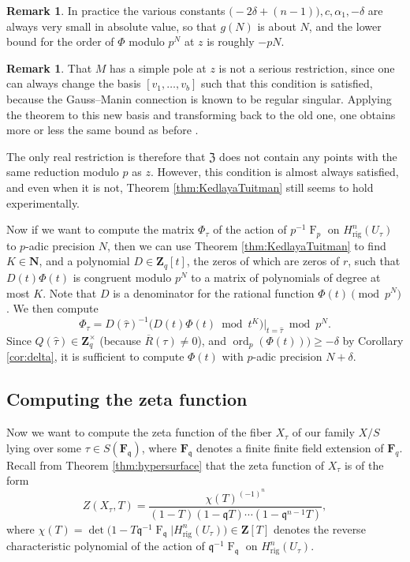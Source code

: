 \documentclass[a4paper,11pt]{article}
\numberwithin{equation}{section}
\newcommand{\NN}{\mathbf{N}} %
\newcommand{\ZZ}{\mathbf{Z}} %
\newcommand{\FF}{\mathbf{F}} %
\DeclareMathOperator{\ord}{ord}          %
\DeclareMathOperator{\Frob}{F}           %
\providecommand{\Hrig}{H_{\text{rig}}}  %
\theoremstyle{definition}
\newtheorem{rem}[thm]{Remark}
\begin{document}
\begin{rem}
In practice the various constants $\bigl( -2 \delta + (n-1) \bigr), c, \alpha_1, -\delta$ are always very small
in absolute value, so that $g(N)$ is about $N$, and the lower bound for the order of $\Phi$ modulo $p^N$ at $z$ is roughly $-pN$.
\end{rem}

\begin{rem}
That $M$ has a simple pole at $z$ is not a serious restriction, since
one can always change the basis $[v_1,\dotsc,v_b]$ such that this condition is
satisfied, because the Gauss--Manin connection is known to be regular singular. 
Applying the theorem to this new basis and transforming back to the old one, one
obtains more or less the same bound as before \citep[Corollary~2.6]{KedlayaTuitman2012}.

The only real restriction is therefore that $\mathfrak{Z}$ does not contain any points
with the same reduction modulo $p$ as $z$. However, this condition is almost always
satisfied, and even when it is not, Theorem \ref{thm:KedlayaTuitman} still seems
to hold experimentally.
\end{rem}

Now if we want to compute the matrix $\Phi_{\tau}$ of the action of $p^{-1} \Frob_p$ on 
$\Hrig^{n}(U_{\tau})$ to $p$-adic precision $N$, then we can use Theorem \ref{thm:KedlayaTuitman} 
to find $K \in \NN$, and a polynomial $D \in \ZZ_q[t]$, the zeros of which are zeros of $r$, such that 
$D(t) \Phi(t)$ is congruent modulo $p^N$ to a matrix of polynomials of degree at most $K$. Note that
$D$ is a denominator for the rational function $\Phi(t) \pmod{p^N}$. We then compute
\begin{equation*}
\Phi_{\tau} = D(\hat{\tau})^{-1} \bigl( D(t) \Phi(t) \bmod{t^{K}} \bigr)|_{t=\hat{\tau}} \bmod{p^{N}}.
\end{equation*}
Since $Q(\hat{\tau}) \in \ZZ_q^{\times}$ (because $\overline{R}(\tau) \neq 0$), and $\ord_p(\Phi(t))) \geq -\delta$
by Corollary \ref{cor:delta}, it is sufficient to compute $\Phi(t)$ with $p$-adic precision $N+\delta$.

\subsection{Computing the zeta function}
\label{sec:ZetaFunctions}

Now we want to compute the zeta function of the fiber $X_{\tau}$ of
our family $X/S$ lying over some $\tau \in S(\FF_{\mathfrak{q}})$, 
where $\FF_{\mathfrak{q}}$ denotes a finite finite field extension of $\FF_q$.  
Recall from Theorem \ref{thm:hypersurface} 
that the zeta function of $X_{\tau}$ is of the form
\begin{equation*}
Z(X_{\tau},T) = \frac{\chi(T)^{(-1)^n}}{(1 - T) (1 - \mathfrak{q}T) \dotsm (1 - \mathfrak{q}^{n-1}T)},
\end{equation*}
where $\chi(T) = \det \bigl( 1 - T \mathfrak{q}^{-1} \Frob_{\mathfrak{q}} | \Hrig^n(U_{\tau}) \bigr) \in \ZZ[T]$ 
denotes the reverse characteristic polynomial of the action of $\mathfrak{q}^{-1} \Frob_{\mathfrak{q}}$ 
on $\Hrig^n(U_{\tau})$.
\end{document}
